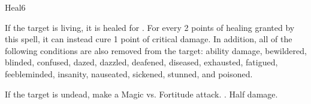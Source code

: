\begin{spellsection}{Heal}{6}
\begin{spellheader}
\end{spellheader}
\begin{spellcontent}
    \begin{spelltargetinginfo}
    \end{spelltargetinginfo}
    \begin{spelleffects}
        \spelleffect If the target is living, it is healed for . For every 2 points of healing granted by this spell, it can instead cure 1 point of critical damage. In addition, all of the following conditions are also removed from the target: ability damage, bewildered, blinded, confused, dazed, dazzled, deafened, diseased, exhausted, fatigued, feebleminded, insanity, nauseated, sickened, stunned, and poisoned.
        \begin{spellattacktriggered}{If the target is undead, make a Magic vs. Fortitude attack.}
            \spellsuccess {}.
            \spellfailure Half damage.
        \end{spellattacktriggered}
    \end{spelleffects}
\end{spellcontent}
\begin{spellfooter}
\end{spellfooter}
\end{spellsection}

